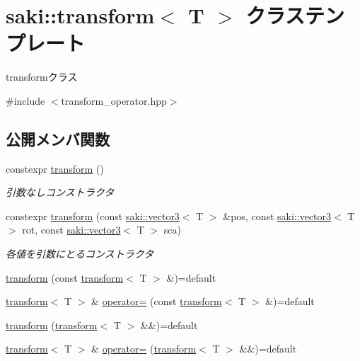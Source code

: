 \hypertarget{classsaki_1_1transform}{}\section{saki\+:\+:transform$<$ T $>$ クラステンプレート}
\label{classsaki_1_1transform}


transformクラス  




{\ttfamily \#include $<$transform\+\_\+operator.\+hpp$>$}

\subsection*{公開メンバ関数}
\begin{DoxyCompactItemize}
\item 
constexpr \mbox{\hyperlink{classsaki_1_1transform_a6d3d745d729424d11a67514dcbedfc4b}{transform}} ()
\begin{DoxyCompactList}\small\item\em 引数なしコンストラクタ \end{DoxyCompactList}\item 
constexpr \mbox{\hyperlink{classsaki_1_1transform_ac15fa38cf81fb789850a512fc5baef25}{transform}} (const \mbox{\hyperlink{classsaki_1_1vector3}{saki\+::vector3}}$<$ T $>$ \&pos, const \mbox{\hyperlink{classsaki_1_1vector3}{saki\+::vector3}}$<$ T $>$ rot, const \mbox{\hyperlink{classsaki_1_1vector3}{saki\+::vector3}}$<$ T $>$ sca)
\begin{DoxyCompactList}\small\item\em 各値を引数にとるコンストラクタ \end{DoxyCompactList}\item 
\mbox{\hyperlink{classsaki_1_1transform_a973773964975d30d4f4a114ebb94d5ef}{transform}} (const \mbox{\hyperlink{classsaki_1_1transform}{transform}}$<$ T $>$ \&)=default
\item 
\mbox{\hyperlink{classsaki_1_1transform}{transform}}$<$ T $>$ \& \mbox{\hyperlink{classsaki_1_1transform_a02ae1743b6a54bc004b69b5b9ec3e574}{operator=}} (const \mbox{\hyperlink{classsaki_1_1transform}{transform}}$<$ T $>$ \&)=default
\item 
\mbox{\hyperlink{classsaki_1_1transform_a570e4f075582d4c50376f1170bce7af2}{transform}} (\mbox{\hyperlink{classsaki_1_1transform}{transform}}$<$ T $>$ \&\&)=default
\item 
\mbox{\hyperlink{classsaki_1_1transform}{transform}}$<$ T $>$ \& \mbox{\hyperlink{classsaki_1_1transform_aa43de25eaecdc6d713f83998247e9736}{operator=}} (\mbox{\hyperlink{classsaki_1_1transform}{transform}}$<$ T $>$ \&\&)=default

\end{DoxyCompactItemize}
